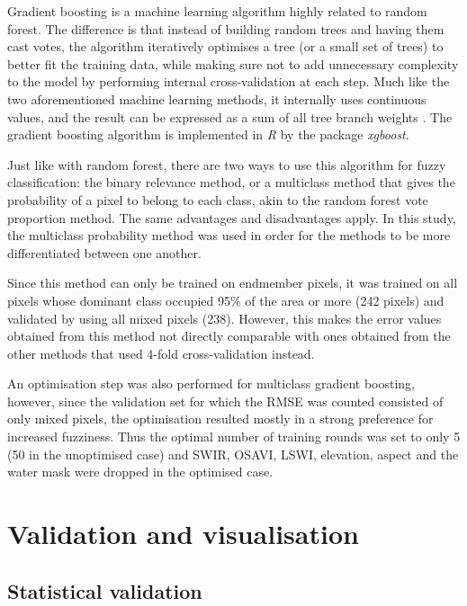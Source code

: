 \documentclass[a4paper,12pt]{scrbook}
\begin{document}
Gradient boosting is a machine learning algorithm highly related to random forest. The difference is that instead of building random trees and having them cast votes, the algorithm iteratively optimises a tree (or a small set of trees) to better fit the training data, while making sure not to add unnecessary complexity to the model by performing internal cross-validation at each step. Much like the two aforementioned machine learning methods, it internally uses continuous values, and the result can be expressed as a sum of all tree branch weights \citep{friedman2001gradientboost}. The gradient boosting algorithm is implemented in \textit{R} by the package \textit{xgboost}.

Just like with random forest, there are two ways to use this algorithm for fuzzy classification: the binary relevance method, or a multiclass method that gives the probability of a pixel to belong to each class, akin to the random forest vote proportion method. The same advantages and disadvantages apply. In this study, the multiclass probability method was used in order for the methods to be more differentiated between one another.

Since this method can only be trained on endmember pixels, it was trained on all pixels whose dominant class occupied 95\% of the area or more (242 pixels) and validated by using all mixed pixels (238). However, this makes the error values obtained from this method not directly comparable with ones obtained from the other methods that used 4-fold cross-validation instead.

An optimisation step was also performed for multiclass gradient boosting, however, since the validation set for which the RMSE was counted consisted of only mixed pixels, the optimisation resulted mostly in a strong preference for increased fuzziness. Thus the optimal number of training rounds was set to only 5 (50 in the unoptimised case) and SWIR, OSAVI, LSWI, elevation, aspect and the water mask were dropped in the optimised case.

\section{Validation and visualisation}

\subsection{Statistical validation}
\end{document}
